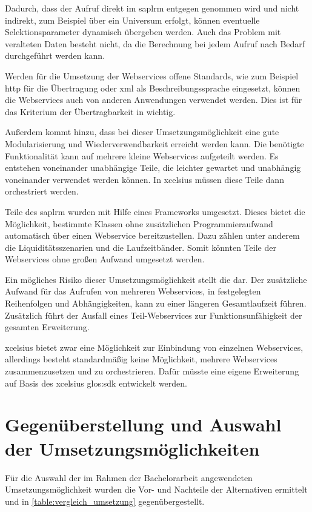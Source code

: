 \begin{onehalfspacing}
Dadurch, dass der Aufruf direkt im \gls{saplrm} entgegen genommen wird und nicht indirekt, zum Beispiel über ein Universum erfolgt, können eventuelle Selektionsparameter dynamisch übergeben werden. Auch das Problem mit veralteten Daten besteht nicht, da die Berechnung bei jedem Aufruf nach Bedarf durchgeführt werden kann.

Werden für die Umsetzung der Webservices offene Standards, wie zum Beispiel \gls{http} für die Übertragung oder \gls{xml} als Beschreibungssprache eingesetzt, können die Webservices auch von anderen Anwendungen verwendet werden. Dies ist für das Kriterium der Übertragbarkeit in  wichtig.

Außerdem kommt hinzu, dass bei dieser Umsetzungsmöglichkeit eine gute Modularisierung und Wiederverwendbarkeit erreicht werden kann. Die benötigte Funktionalität kann auf mehrere kleine Webservices aufgeteilt werden. Es entstehen voneinander unabhängige Teile, die leichter gewartet und unabhängig voneinander verwendet werden können. In \gls{xcelsius} müssen diese Teile dann orchestriert werden.

Teile des \gls{saplrm} wurden mit Hilfe eines Frameworks umgesetzt. Dieses bietet die Möglichkeit, bestimmte Klassen ohne zusätzlichen Programmieraufwand automatisch über einen Webservice bereitzustellen. Dazu zählen unter anderem die Liquiditätsszenarien und die Laufzeitbänder. Somit könnten Teile der Webservices ohne großen Aufwand umgesetzt werden.

Ein mögliches Risiko dieser Umsetzungsmöglichkeit stellt die  dar. Der zusätzliche Aufwand für das Aufrufen von mehreren Webservices, in festgelegten Reihenfolgen und Abhängigkeiten, kann zu einer längeren Gesamtlaufzeit führen. Zusätzlich führt der Ausfall eines Teil-Webservices zur Funktionsunfähigkeit der gesamten Erweiterung.

\gls{xcelsius} bietet zwar eine Möglichkeit zur Einbindung von einzelnen Webservices, allerdings besteht standardmäßig keine Möglichkeit, mehrere Webservices zusammenzusetzen und zu orchestrieren. Dafür müsste eine eigene Erweiterung auf Basis des \gls{xcelsius} \gls{glos:sdk} entwickelt werden.

\section{Gegenüberstellung und Auswahl der Umsetzungsmöglichkeiten}
Für die Auswahl der im Rahmen der Bachelorarbeit angewendeten Umsetzungsmöglichkeit wurden die Vor- und Nachteile der Alternativen ermittelt und in \vref{table:vergleich_umsetzung} gegenübergestellt.


\end{onehalfspacing}

